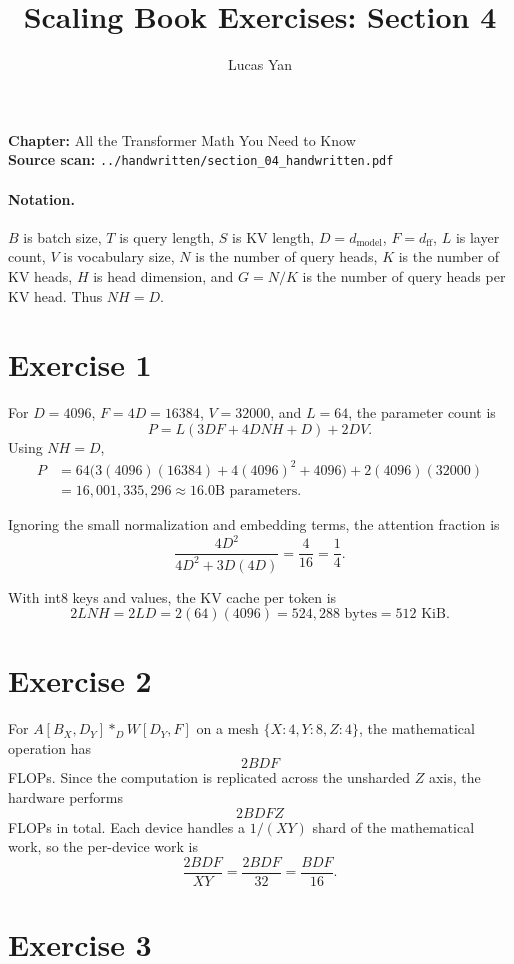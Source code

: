 \documentclass[11pt]{article}
\title{Scaling Book Exercises: Section 4}
\author{Lucas Yan}
\date{}
\begin{document}
\maketitle

\noindent
\textbf{Chapter:} All the Transformer Math You Need to Know\\
\textbf{Source scan:} \texttt{../handwritten/section\_04\_handwritten.pdf}

\paragraph{Notation.}
$B$ is batch size, $T$ is query length, $S$ is KV length, $D=d_{\mathrm{model}}$,
$F=d_{\mathrm{ff}}$, $L$ is layer count, $V$ is vocabulary size, $N$ is the
number of query heads, $K$ is the number of KV heads, $H$ is head dimension,
and $G=N/K$ is the number of query heads per KV head. Thus $NH=D$.

\section*{Exercise 1}

For $D=4096$, $F=4D=16384$, $V=32000$, and $L=64$, the parameter count is
\[
P=L(3DF+4DNH+D)+2DV.
\]
Using $NH=D$,
\begin{align*}
P
&=64\bigl(3(4096)(16384)+4(4096)^2+4096\bigr)
  +2(4096)(32000)\\
&=16{,}001{,}335{,}296
 \approx 16.0\text{B parameters}.
\end{align*}

Ignoring the small normalization and embedding terms, the attention fraction is
\[
\frac{4D^2}{4D^2+3D(4D)}=\frac{4}{16}=\frac14.
\]

With int8 keys and values, the KV cache per token is
\[
2LNH=2LD=2(64)(4096)=524{,}288\text{ bytes}=512\text{ KiB}.
\]

\section*{Exercise 2}

For $A[B_X,D_Y] *_D W[D_Y,F]$ on a mesh
$\{X:4,Y:8,Z:4\}$, the mathematical operation has
\[
2BDF
\]
FLOPs. Since the computation is replicated across the unsharded $Z$ axis, the
hardware performs
\[
2BDFZ
\]
FLOPs in total. Each device handles a $1/(XY)$ shard of the mathematical work,
so the per-device work is
\[
\frac{2BDF}{XY}=\frac{2BDF}{32}=\frac{BDF}{16}.
\]

\section*{Exercise 3}
\end{document}
